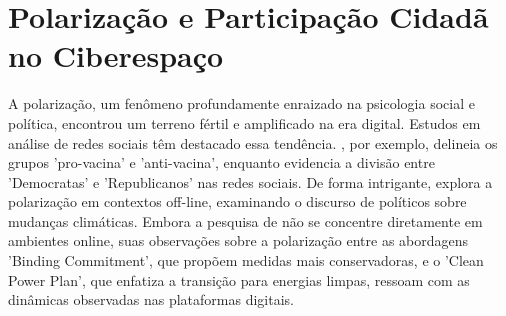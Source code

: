 \section{Polarização e Participação Cidadã no Ciberespaço}

A polarização, um fenômeno profundamente enraizado na psicologia social e política, encontrou um terreno fértil e amplificado na era digital. Estudos em análise de redes sociais têm destacado essa tendência. , por exemplo, delineia os grupos 'pro-vacina' e 'anti-vacina', enquanto  evidencia a divisão entre 'Democratas' e 'Republicanos' nas redes sociais. De forma intrigante,  explora a polarização em contextos off-line, examinando o discurso de políticos sobre mudanças climáticas. Embora a pesquisa de  não se concentre diretamente em ambientes online, suas observações sobre a polarização entre as abordagens 'Binding Commitment', que propõem medidas mais conservadoras, e o 'Clean Power Plan', que enfatiza a transição para energias limpas, ressoam com as dinâmicas observadas nas plataformas digitais.

